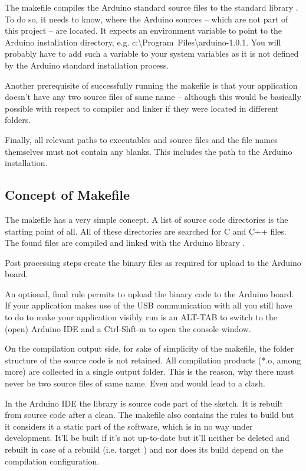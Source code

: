 The makefile compiles the Arduino standard source files to the standard
library . To do so, it needs to know, where the Arduino sources
-- which are not part of this project -- are located. It expects an
environment variable  to point to the Arduino
installation directory, e.g.
c:\textbackslash{}Program~Files\textbackslash\-arduino-1.0.1. You will
probably have to add such a variable to your system variables as it is not
defined by the Arduino standard installation process.

Another prerequisite of successfully running the makefile is that your
application doesn't have any two source files of same name -- although
this would be basically possible with respect to compiler and linker if
they were located in different folders.

Finally, all relevant paths to executables and source files and the file
names themselves must not contain any blanks. This includes the path to
the Arduino installation.

\subsection{Concept of Makefile}

The makefile has a very simple concept. A list of source code directories
is the starting point of all. All of these directories are searched for C
and C++ files. The found files are compiled and linked with the Arduino
library .

Post processing steps create the binary files as required for upload to
the Arduino board.

An optional, final rule permits to upload the binary code to the
Arduino board. If your application makes use of the USB communication with
 all you still have to do to make your application visibly
run is an ALT-TAB to switch to the (open) Arduino IDE and a Ctrl-Shft-m to
open the console window.

On the compilation output side, for sake of simplicity of the makefile,
the folder structure of the source code is not retained. All compilation
products (*.o, among more) are collected in a single output folder. This
is the reason, why there must never be two source files of same name. Even
 and  would lead to a clash.

In the Arduino IDE the library  is source code part of the
sketch. It is rebuilt from source code after a clean. The \rtos{} makefile
also contains the rules to build  but it considers it a
static part of the software, which is in no way under development. It'll
be built if it's not up-to-date but it'll neither be deleted and rebuilt
in case of a rebuild (i.e. target ) and nor does its build
depend on the compilation configuration.

